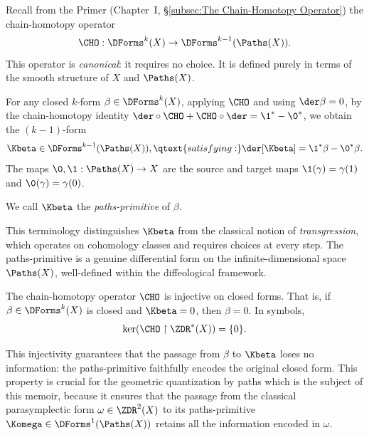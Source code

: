 \begin{article}
  \label{art:paths-primitives}
  Recall from the Primer (Chapter~I, \S\ref{subsec:The Chain-Homotopy Operator})
  the chain-homotopy operator
  \[
    \CHO: \DForms^k(X) \to \DForms^{k-1}(\Paths(X)).
    \]%
  This operator is \emph{canonical}:
  it requires no choice.
  It is defined purely in terms of the smooth structure of $X$ and $\Paths(X)$.
  
  For any closed $k$-form $\beta \in \DForms^k(X)$,
  applying $\CHO$ and using $\der\beta = 0$,
  by the chain-homotopy identity $\der \circ \CHO + \CHO \circ \der = \1^* - \0^*$,
  we obtain the $(k-1)$-form
  \[
    \Kbeta \in \DForms^{k-1}(\Paths(X)),
    \qtext{satisfying:}
    \der[\Kbeta] = \1^*\beta - \0^*\beta.
    \]%
  The maps $\0, \1: \Paths(X) \to X$ are the source and target maps
  $\1(\gamma) = \gamma(1)$ and $\0(\gamma) = \gamma(0)$.
  
  \begin{definition}
    We call $\Kbeta$ the \emph{paths-primitive} of $\beta$.
  \end{definition}
  
  This terminology distinguishes $\Kbeta$ from the classical notion of \emph{transgression},
  which operates on cohomology classes and requires choices at every step.
  The paths-primitive is a genuine differential form on the infinite-dimensional space $\Paths(X)$,
  well-defined within the diffeological framework.
  
  \begin{proposition}
    The chain-homotopy operator $\CHO$ is injective on closed forms.
    That is,
    if $\beta \in \DForms^k(X)$ is closed and $\Kbeta = 0$,
    then $\beta = 0$.
    In symbols,
    \[
      \ker(\CHO \restriction \ZDR^*(X)) = \{0\}.
      \]%
  \end{proposition}
  
  This injectivity guarantees that the passage from $\beta$ to $\Kbeta$ loses no information:
  the paths-primitive faithfully encodes the original closed form.
  This property is crucial for the geometric quantization by paths which is the subject of this memoir,
  because it ensures that the passage from the classical parasymplectic form $\omega \in \ZDR^2(X)$
  to its paths-primitive $\Komega \in \DForms^1(\Paths(X))$
  retains all the information encoded in $\omega$.
\end{article}


